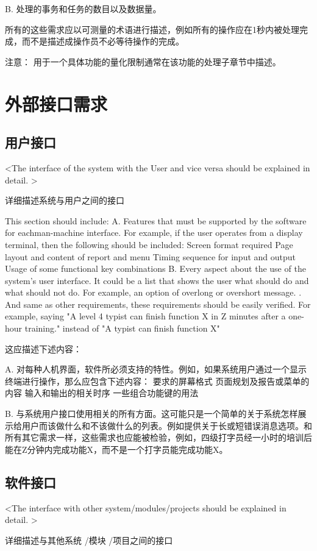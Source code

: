 B. 处理的事务和任务的数目以及数据量。

所有的这些需求应以可测量的术语进行描述，例如所有的操作应在1秒内被处理完成，而不是描述成操作员不必等待操作的完成。

注意： 用于一个具体功能的量化限制通常在该功能的处理子章节中描述。
\section{外部接口需求}
\subsection{用户接口}
<The interface of the system with the User and vice versa should be explained in detail. >

详细描述系统与用户之间的接口

This section should include:
A. Features that must be supported by the software for eachman-machine interface. For example, if the user operates from a display terminal, then the following should be included:
		Screen format required
		Page layout and content of report and menu
		Timing sequence for input and output
		Usage of some functional key combinations
B. Every aspect about the use of the system's user interface. It could be a list that shows the user what should do and what should not do.  For example, an option of overlong or overshort message. . And same as other requirements, these requirements should be easily verified. For example, saying "A level 4 typist can finish function X in Z minutes after a one-hour training." instead of "A typist can finish function X"	

这应描述下述内容：

A. 对每种人机界面，软件所必须支持的特性。例如，如果系统用户通过一个显示终端进行操作，那么应包含下述内容：
要求的屏幕格式
页面规划及报告或菜单的内容
输入和输出的相关时序
一些组合功能键的用法

B. 与系统用户接口使用相关的所有方面。这可能只是一个简单的关于系统怎样展示给用户而该做什么和不该做什么的列表。例如提供关于长或短错误消息选项。和所有其它需求一样，这些需求也应能被检验，例如，四级打字员经一小时的培训后能在Z分钟内完成功能X，而不是一个打字员能完成功能X。

\subsection{软件接口}
<The interface with other system/modules/projects should be explained in detail. >

详细描述与其他系统 /模块 /项目之间的接口

